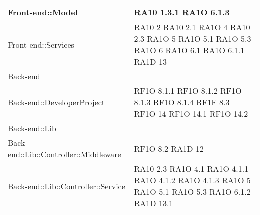 \begin{center}
\begin{longtable}{|p{7cm}|p{3cm}|}
		Front-end::Model & RA10 1.3.1 \newline RA1O 6.1.3 \\ \hline
		
		Front-end::Services & RA10 2 \newline RA10 2.1 \newline RA1O 4 \newline RA10 2.3 \newline RA1O 5 \newline RA1O 5.1 \newline RA1O 5.3 \newline	RA1O 6 \newline 
		RA1O 6.1 \newline RA1O 6.1.1 \newline RA1D 13 \newline
		\\ \hline
	
	Back-end & \\ \hline
	
		Back-end::DeveloperProject & RF1O 8.1.1 \newline RF1O 8.1.2 \newline RF1O 8.1.3 RF1O 8.1.4 \newline RF1F 8.3 \newline RF1O 14 \newline
		RF1O 14.1 \newline RF1O 14.2 \newline 
		 \\ \hline
		
		Back-end::Lib & \\ \hline
		
			Back-end::Lib::Controller::Middleware & RF1O 8.2 \newline RA1D 12 \newline 			\\ \hline
			Back-end::Lib::Controller::Service & RA10 2.3 \newline RA1O 4.1 \newline RA1O 4.1.1 \newline RA1O 4.1.2 \newline  RA1O 4.1.3 \newline RA1O 5 \newline RA1O 5.1 \newline RA1O 5.3 \newline RA1O 6.1.2 \newline  RA1D 13.1
			 	\\ \hline
			

\end{longtable}
\end{center}
